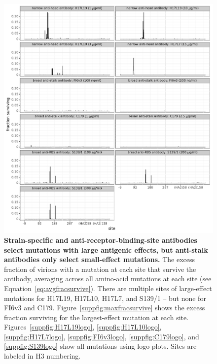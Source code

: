 \documentclass[11pt]{article}
\begin{document}
\begin{figure}
\centerline{\includegraphics[width=\textwidth]{figs/avgfracsurvive.pdf}}
\caption{
\label{fig:avgfracsurvive}
{\bf Strain-specific and anti-receptor-binding-site antibodies select mutations with large antigenic effects, but anti-stalk antibodies only select small-effect mutations.}
The excess fraction of virions with a mutation at each site that survive the antibody, averaging across all amino-acid mutations at each site (see Equation~\ref{eq:avgfracsurvive}).
There are multiple sites of large-effect mutations for H17L19, H17L10, H17L7, and S139/1 -- but none for FI6v3 and C179.
Figure~\ref{suppfig:maxfracsurvive} shows the excess fraction surviving for the largest-effect mutation at each site.
Figures~\ref{suppfig:H17L19logo}, \ref{suppfig:H17L10logo}, \ref{suppfig:H17L7logo}, \ref{suppfig:FI6v3logo}, \ref{suppfig:C179logo}, and \ref{suppfig:S139logo} show all mutations using logo plots.
Sites are labeled in H3 numbering.
}
\end{figure}
\end{document}
